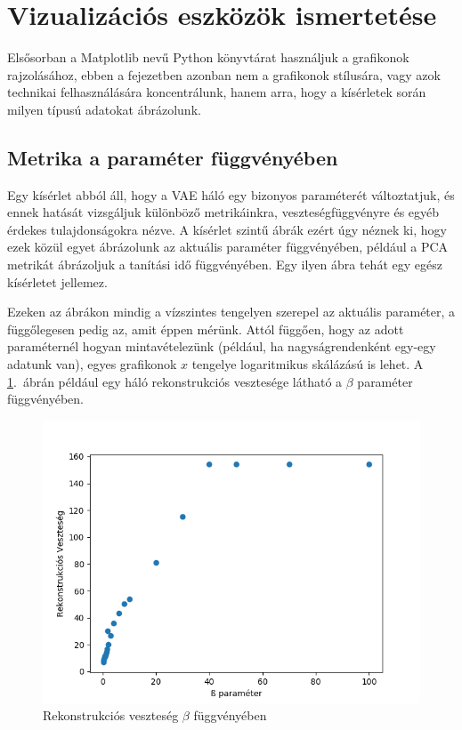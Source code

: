 \section{Vizualizációs eszközök ismertetése}

Elsősorban a Matplotlib nevű Python könyvtárat használjuk a grafikonok rajzolásához, ebben a fejezetben azonban nem a grafikonok stílusára, vagy azok technikai felhasználására koncentrálunk, hanem arra, hogy a kísérletek során milyen típusú adatokat ábrázolunk.

\subsection{Metrika a paraméter függvényében}

Egy kísérlet abból áll, hogy a VAE háló egy bizonyos paraméterét változtatjuk, és ennek hatását vizsgáljuk különböző metrikáinkra, veszteségfüggvényre és egyéb érdekes tulajdonságokra nézve. A kísérlet szintű ábrák ezért úgy néznek ki, hogy ezek közül egyet ábrázolunk az aktuális paraméter függvényében, például a PCA metrikát ábrázoljuk a tanítási idő függvényében. Egy ilyen ábra tehát egy egész kísérletet jellemez.

Ezeken az ábrákon mindig a vízszintes tengelyen szerepel az aktuális paraméter, a függőlegesen pedig az, amit éppen mérünk. Attól függően, hogy az adott paraméternél hogyan mintavételezünk (például, ha nagyságrendenként egy-egy adatunk van), egyes grafikonok $x$ tengelye logaritmikus skálázású is lehet. A \ref{mgraph}.~ábrán például egy háló rekonstrukciós vesztesége látható a $\beta$ paraméter függvényében.

\begin{figure}[h!]
\begin{center}
 
  
	\begin{center}
	\includegraphics[width=0.75\linewidth]{metrics/vae_beta-loss.png}
	\end{center}
	
  \caption{Rekonstrukciós veszteség $\beta$ függvényében} \label{mgraph}
\end{center}
\end{figure}

